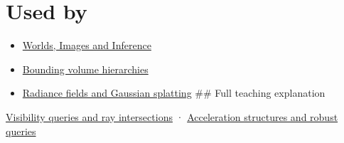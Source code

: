 \section{Used by}\label{appendix-47ac1bd6d144-used-by}

\begin{itemize}
\item
  \href{Continuous\%20Notes/University\%20-\%20Worlds,\%20Images\%20and\%20Inference\%20-\%20Graphics,\%20Vision\%20and\%20Photography}{Worlds, Images and Inference}
\item
  \hyperref[appendix-0b426c47dd78]{Bounding volume hierarchies}
\item
  \hyperref[appendix-c5b332e400e7]{Radiance fields and Gaussian splatting} \#\# Full teaching explanation
\end{itemize}

\href{Continuous\%20Notes/University\%20-\%20Worlds,\%20Images\%20and\%20Inference\%20-\%20Graphics,\%20Vision\%20and\%20Photography\#Visibility\%20queries\%20and\%20ray\%20intersections}{Visibility queries and ray intersections} · \href{Continuous\%20Notes/University\%20-\%20Worlds,\%20Images\%20and\%20Inference\%20-\%20Graphics,\%20Vision\%20and\%20Photography\#Acceleration\%20structures\%20and\%20robust\%20queries}{Acceleration structures and robust queries}
